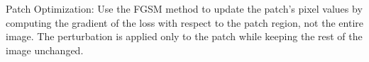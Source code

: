 \documentclass[conference]{IEEEtran}
\begin{document}
Patch Optimization: Use the FGSM method to update the patch's pixel values by computing the gradient of the loss with respect to the patch region, not the entire image. The perturbation is applied only to the patch while keeping the rest of the image unchanged.



%
%



%
%
\end{document}
